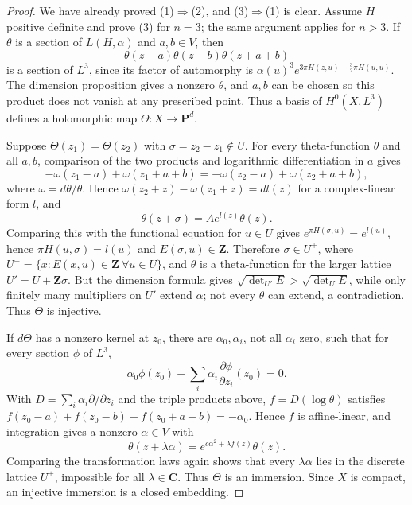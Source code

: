 \begin{proof}
We have already proved (1)$\Rightarrow$(2), and (3)$\Rightarrow$(1) is
clear.  Assume $H$ positive definite and prove (3) for $n=3$; the same
argument applies for $n>3$.  If $\theta$ is a section of $L(H,\alpha)$ and
$a,b\in V$, then
\[
 \theta(z-a)\theta(z-b)\theta(z+a+b)
\]
is a section of $L^3$, since its factor of automorphy is
$\alpha(u)^3e^{3\pi H(z,u)+\frac32\pi H(u,u)}$.  The dimension proposition
gives a nonzero $\theta$, and $a,b$ can be chosen so this product does not
vanish at any prescribed point.  Thus a basis of $H^0(X,L^3)$ defines a
holomorphic map $\Theta:X\to\mathbf P^d$.

Suppose $\Theta(z_1)=\Theta(z_2)$ with $\sigma=z_2-z_1\notin U$.  For every
theta-function $\theta$ and all $a,b$, comparison of the two products and
logarithmic differentiation in $a$ gives
\[
 -\omega(z_1-a)+\omega(z_1+a+b)
 =-\omega(z_2-a)+\omega(z_2+a+b),
\]
where $\omega=d\theta/\theta$.  Hence
$\omega(z_2+z)-\omega(z_1+z)=dl(z)$ for a complex-linear form $l$, and
\[
 \theta(z+\sigma)=Ae^{l(z)}\theta(z).
\]
Comparing this with the functional equation for $u\in U$ gives
$e^{\pi H(\sigma,u)}=e^{l(u)}$, hence $\pi H(u,\sigma)=l(u)$ and
$E(\sigma,u)\in\mathbf Z$.  Therefore $\sigma\in U^+$, where
$U^+=\{x:E(x,u)\in\mathbf Z\ \forall u\in U\}$, and $\theta$ is a
theta-function for the larger lattice $U'=U+\mathbf Z\sigma$.  But the
dimension formula gives $\sqrt{\det_{U'}E}>\sqrt{\det_UE}$, while only
finitely many multipliers on $U'$ extend $\alpha$; not every $\theta$ can
extend, a contradiction.  Thus $\Theta$ is injective.

If $d\Theta$ has a nonzero kernel at $z_0$, there are $\alpha_0,\alpha_i$,
not all $\alpha_i$ zero, such that for every section $\phi$ of $L^3$,
\[
 \alpha_0\phi(z_0)+\sum_i\alpha_i\frac{\partial\phi}{\partial z_i}(z_0)=0.
\]
With $D=\sum_i\alpha_i\partial/\partial z_i$ and the triple products above,
$f=D(\log\theta)$ satisfies
$f(z_0-a)+f(z_0-b)+f(z_0+a+b)=-\alpha_0$.  Hence $f$ is affine-linear, and
integration gives a nonzero $\alpha\in V$ with
\[
 \theta(z+\lambda\alpha)=e^{c\alpha^2+\lambda f(z)}\theta(z).
\]
Comparing the transformation laws again shows that every $\lambda\alpha$
lies in the discrete lattice $U^+$, impossible for all $\lambda\in\mathbf C$.
Thus $\Theta$ is an immersion.  Since $X$ is compact, an injective immersion
is a closed embedding.
\end{proof}

